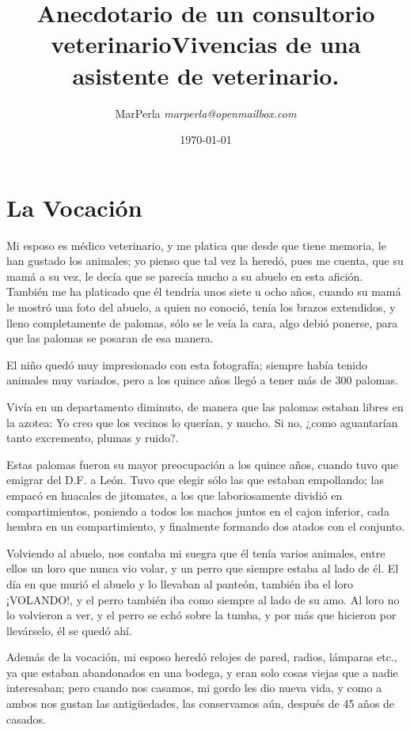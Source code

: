 \documentclass[letterpaper, 12pt]{book}
\title{{\sffamily \huge Anecdotario de un consultorio veterinario}{\calligra{}Vivencias de una asistente de veterinario.}}
\author{{\Large  MarPerla }\textit{marperla@openmailbox.com }}
\date{\today}
\begin{document}
\maketitle
\tableofcontents
\chapter{La Vocación}
Mi esposo es médico veterinario, y me platica que desde que tiene memoria, le han gustado los animales; yo pienso que tal vez la heredó, pues me cuenta, que su mamá a su vez, le decía que se parecía mucho a su abuelo en esta afición. También me ha platicado que él tendría unos siete u ocho años, cuando su mamá le mostró una foto del abuelo, a quien no conoció, tenía los brazos extendidos, y lleno completamente de palomas, sólo se le veía la cara, algo debió ponerse, para que las palomas se posaran de esa manera. 

El niño quedó muy impresionado con esta fotografía; siempre había tenido animales muy variados, pero a los quince años llegó a tener más de 300 palomas. 

Vivía en un departamento diminuto, de manera que las palomas estaban libres en la azotea: Yo creo que los vecinos lo querían, y mucho. Si no, ¿como aguantarían tanto excremento, plumas y ruido?.

Estas palomas fueron su mayor preocupación a los quince años, cuando tuvo que emigrar del D.F. a León. Tuvo que elegir sólo las que estaban empollando; las empacó en huacales de jitomates, a los que laboriosamente dividió en compartimientos, poniendo a todos los machos juntos en el cajon inferior, cada hembra en un compartimiento, y finalmente formando dos atados con el conjunto.

Volviendo al  abuelo, nos contaba mi suegra que él tenía varios animales, entre ellos un loro que nunca vio volar, y un perro que siempre estaba al lado de él. El día en que murió el abuelo y lo llevaban al panteón, también iba el loro ¡VOLANDO!, y el perro también iba como siempre al lado de su amo. Al loro no lo volvieron a ver, y el perro se echó sobre la tumba, y por más que hicieron por llevárselo, él se quedó ahí. 

Además de la vocación, mi esposo heredó relojes de pared, radios, lámparas etc., ya que estaban abandonados en una bodega, y eran solo cosas viejas que a nadie interesaban; pero cuando nos casamos, mi gordo les dio nueva vida, y como a ambos nos gustan las antigüedades, las conservamos aún, después de 45 años de casados.
\end{document}
